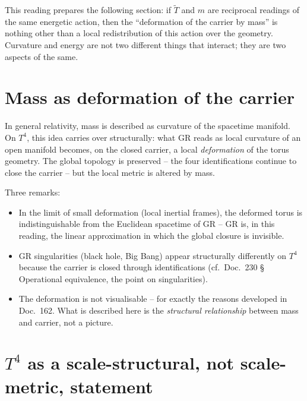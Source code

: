 This reading prepares the following section: if $\tilde T$ and $m$
are reciprocal readings of the same energetic action, then the
``deformation of the carrier by mass'' is nothing other than a
local redistribution of this action over the geometry. Curvature
and energy are not two different things that interact; they are
two aspects of the same.

\section{Mass as deformation of the carrier}

In general relativity, mass is described as curvature of the
spacetime manifold. On $T^4$, this idea carries over structurally:
what GR reads as local curvature of an open manifold becomes, on the
closed carrier, a local \emph{deformation} of the torus geometry. The
global topology is preserved -- the four identifications continue to
close the carrier -- but the local metric is altered by mass.

Three remarks:

\begin{itemize}[leftmargin=2em,itemsep=4pt,topsep=4pt]
  \item In the limit of small deformation (local inertial frames),
        the deformed torus is indistinguishable from the Euclidean
        spacetime of GR -- GR is, in this reading, the linear
        approximation in which the global closure is invisible.
  \item GR singularities (black hole, Big Bang) appear structurally
        differently on $T^4$ because the carrier is closed through
        identifications (cf.\ Doc.~230 §\,Operational equivalence,
        the point on singularities).
  \item The deformation is not visualisable -- for exactly the
        reasons developed in Doc.~162. What is described here is the
        \emph{structural relationship} between mass and carrier, not
        a picture.
\end{itemize}

\section{$T^4$ as a scale-structural, not scale-metric, statement}

